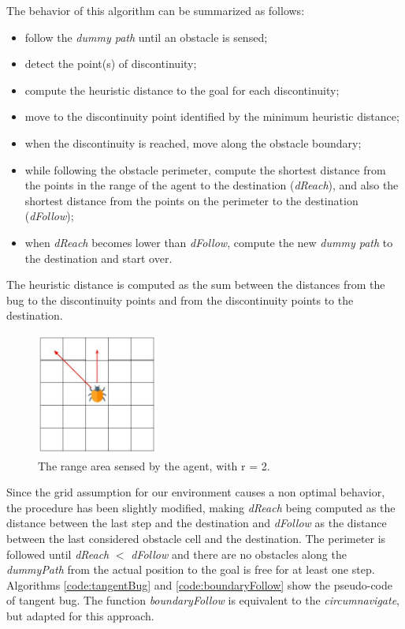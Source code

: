 \documentclass[conference]{IEEEtran}
\begin{document}
The behavior of this algorithm can be summarized as follows:
\begin{itemize}
	\item follow the \emph{dummy path} until an obstacle is sensed;
	\item detect the point(s) of discontinuity;
	\item compute the heuristic distance to the goal for each discontinuity;
	\item move to the discontinuity point identified by the minimum heuristic distance;
	\item when the discontinuity is reached, move along the obstacle boundary;
	\item while following the obstacle perimeter, compute the shortest distance from the points in the range of the agent to the destination (\emph{dReach}), and also the shortest distance from the points on the perimeter to the destination (\emph{dFollow});
	\item when \emph{dReach} becomes lower than \emph{dFollow}, compute the new \emph{dummy path} to the destination and start over.
\end{itemize}

The heuristic distance is computed as the sum between the distances from the bug to the discontinuity points and from the discontinuity points to the destination.

\begin{figure}[]
	\includegraphics[width=4cm]{rangeArea.jpg}
	\centering
	\caption{The range area sensed by the agent, with r = 2.}
	\label{fig:range}
\end{figure}

Since the grid assumption for our environment causes a non optimal behavior, the procedure has been slightly modified, making \emph{dReach} being computed as the distance between the last step and the destination and \emph{dFollow} as the distance between the last considered obstacle cell and the destination. The perimeter is followed until \emph{dReach} $<$ \emph{dFollow} and there are no obstacles along the \emph{dummyPath} from the actual position to the goal is free for at least one step.
Algorithms \ref{code:tangentBug} and \ref{code:boundaryFollow} show the pseudo-code of tangent bug. The function \emph{boundaryFollow} is equivalent to the \emph{circumnavigate}, but adapted for this approach.
\end{document}
